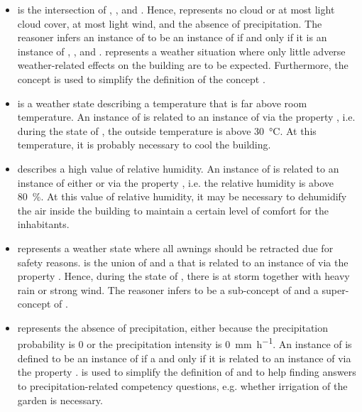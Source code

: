 \begin{itemize}
  \item {} is the intersection of , , and . Hence,  represents no cloud or at most light cloud cover, at most light wind, and the absence of precipitation. The  reasoner infers an instance of  to be an instance of  if and only if it is an instance of , , and .  represents a weather situation where only little adverse weather-related effects on the building are to be expected. Furthermore, the concept  is used to simplify the definition of the concept .
  
  \item {} is a weather state describing a temperature that is far above room temperature. An instance of  is related to an instance of  via the property , i.e. during the state of , the outside temperature is above \SI{30}{\celsius}. At this temperature, it is probably necessary to cool the building.
  
  \item {} describes a high value of relative humidity. An instance of  is related to an instance of either  or  via the property , i.e. the relative humidity is above \SI{80}{\percent}. At this value of relative humidity, it may be necessary to dehumidify the air inside the building to maintain a certain level of comfort for the inhabitants.
  
  \item {} represents a weather state where all awnings should be retracted due for safety reasons.  is the union of  and a  that is related to an instance of  via the property . Hence, during the state of , there is at storm together with heavy rain or strong wind. The  reasoner infers  to be a sub-concept of  and a super-concept of .
  
  \item {} represents the absence of precipitation, either because the precipitation probability is \num{0} or the precipitation intensity is \SI{0}{\milli\metre\per\hour}. An instance of  is defined to be an instance of  if a and only if it is related to an instance of  via the property .  is used to simplify the definition of  and to help finding answers to precipitation-related competency questions, e.g. whether irrigation of the garden is necessary.
  

\end{itemize}
